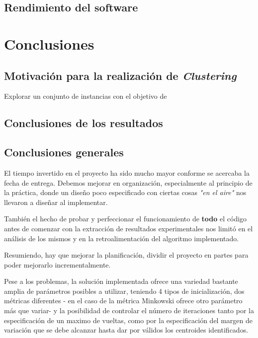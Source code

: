 \documentclass[a4paper]{report}
\begin{document}
	\section{Rendimiento del software}

\chapter{Conclusiones}

	\section{Motivación para la realización de \textit{Clustering}}
	
	Explorar un conjunto de instancias con el objetivo de 
	
	\section{Conclusiones de los resultados}
	
	\section{Conclusiones generales}
	
	El tiempo invertido en el proyecto ha sido mucho mayor conforme se acercaba la fecha de entrega. Debemos mejorar en organización, especialmente al principio de la práctica, donde un diseño poco especificado con ciertas cosas \textit{"en el aire"} nos llevaron a diseñar al implementar.
	
	También el hecho de probar y perfeccionar el funcionamiento de \textbf{todo} el código antes de comenzar con la extracción de resultados experimentales nos limitó en el análisis de los mismos y en la retroalimentación del algoritmo implementado.
	
	Resumiendo, hay que mejorar la planificación, dividir el proyecto en partes para poder mejorarlo incrementalmente.
	
	Pese a los problemas, la solución implementada ofrece una variedad bastante amplia de parámetros posibles a utilizar, teniendo 4 tipos de inicialización, dos métricas diferentes - en el caso de la métrica Minkowski ofrece otro parámetro más que variar- y la posibilidad de controlar el número de iteraciones tanto por la especificación de un maximo de vueltas, como por la especificación del margen de variación que se debe alcanzar hasta dar por válidos los centroides identificados.
	
\end{document}
